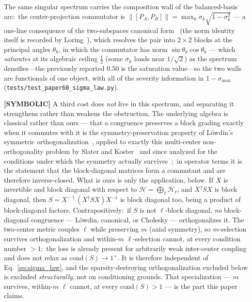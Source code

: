 \documentclass[aps,pra,twocolumn,superscriptaddress,longbibliography]{revtex4-2}
\begin{document}
The same singular spectrum carries the
composition wall of the balanced-basis arc:\ the center-projection commutator
is $\|[P_A,P_B]\|=\max_k\sigma_k\sqrt{1-\sigma_k^{2}}$ --- a one-line
consequence of the two-subspaces canonical
form~\cite{halmos1969,bottcher_spitkovsky2010} (the norm identity itself is
recorded by Loring~\cite{loring2014}), which resolves the pair into
$2\times2$ blocks at the principal angles $\theta_k$, in which the commutator
has norm $\sin\theta_k\cos\theta_k$ --- which \emph{saturates}
at its algebraic ceiling $\tfrac12$ (some $\sigma_k$ lands near $1/\sqrt2$) as
the spectrum densifies---the previously reported $0.50$ is the saturation
value---so the two walls are functionals of one object, with all of the
severity information in $1-\sigma_{\max}$
(\texttt{tests/test\_paper60\_sigma\_law.py}).

\textbf{[SYMBOLIC]} A third cost does \emph{not} live in this spectrum, and
separating it strengthens rather than weakens the obstruction.  The underlying
algebra is classical rather than ours --- that a congruence preserves a block
grading exactly when it commutes with it is the symmetry-preservation property
of L\"owdin's symmetric orthogonalization~\cite{lowdin1950}, applied to exactly
this multi-center non-orthogonality problem by Slater and
Koster~\cite{slater_koster1954} and since analyzed for the conditions under
which the symmetry actually survives~\cite{rokob2008};\ in operator terms it is
the statement that the block-diagonal matrices form a commutant and are
therefore inverse-closed.  What is ours is
only the application, below.  If $X$ is
invertible and block diagonal with respect to
$\mathcal{H}=\bigoplus_\ell\mathcal{H}_\ell$, and $X^\dagger SX$ is block
diagonal, then $S=X^{-\dagger}(X^\dagger SX)X^{-1}$ is block diagonal too,
being a product of block-diagonal factors.  Contrapositively:\ if $S$ is not
$\ell$-block diagonal, \emph{no} block-diagonal congruence --- L\"owdin,
canonical, or Cholesky --- orthogonalizes it.  The two-center metric couples
$\ell$ while preserving $m$ (axial symmetry), so $m$-selection survives
orthogonalization and within-$m$ $\ell$-selection cannot, at every condition
number $>1$:\ the loss is already present for arbitrarily weak inter-center
coupling and does not relax as $\mathrm{cond}(S)\to1^{+}$.  It is therefore
independent of Eq.~\eqref{eq:sigma_law}, and the sparsity-destroying
orthogonalization excluded below is excluded \emph{structurally}, not on
conditioning grounds.  That specialization --- $m$ survives, within-$m$ $\ell$
cannot, at every $\mathrm{cond}(S)>1$ --- is the part this paper claims.
\end{document}
